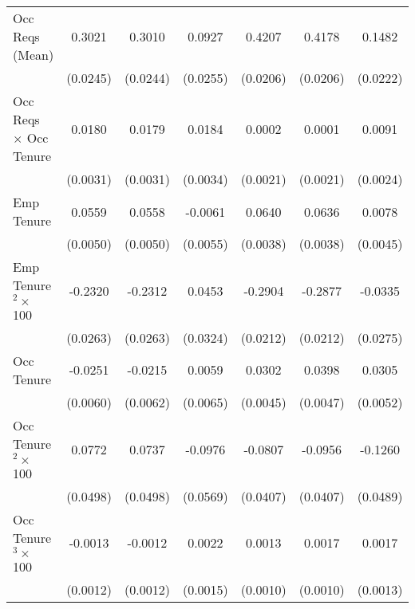{\begin{longtable}{l*{6}{c}}
Occ Reqs (Mean)     &      0.3021\sym{***}&      0.3010\sym{***}&      0.0927\sym{***}&      0.4207\sym{***}&      0.4178\sym{***}&      0.1482\sym{***}\\
                    &    (0.0245)         &    (0.0244)         &    (0.0255)         &    (0.0206)         &    (0.0206)         &    (0.0222)         \\
Occ Reqs $\times$ Occ Tenure&      0.0180\sym{***}&      0.0179\sym{***}&      0.0184\sym{***}&      0.0002         &      0.0001         &      0.0091\sym{***}\\
                    &    (0.0031)         &    (0.0031)         &    (0.0034)         &    (0.0021)         &    (0.0021)         &    (0.0024)         \\
Emp Tenure          &      0.0559\sym{***}&      0.0558\sym{***}&     -0.0061         &      0.0640\sym{***}&      0.0636\sym{***}&      0.0078\sym{*}  \\
                    &    (0.0050)         &    (0.0050)         &    (0.0055)         &    (0.0038)         &    (0.0038)         &    (0.0045)         \\
Emp Tenure$^2\times$ 100&     -0.2320\sym{***}&     -0.2312\sym{***}&      0.0453         &     -0.2904\sym{***}&     -0.2877\sym{***}&     -0.0335         \\
                    &    (0.0263)         &    (0.0263)         &    (0.0324)         &    (0.0212)         &    (0.0212)         &    (0.0275)         \\
Occ Tenure          &     -0.0251\sym{***}&     -0.0215\sym{***}&      0.0059         &      0.0302\sym{***}&      0.0398\sym{***}&      0.0305\sym{***}\\
                    &    (0.0060)         &    (0.0062)         &    (0.0065)         &    (0.0045)         &    (0.0047)         &    (0.0052)         \\
Occ Tenure$^2\times$ 100&      0.0772         &      0.0737         &     -0.0976\sym{*}  &     -0.0807\sym{**} &     -0.0956\sym{**} &     -0.1260\sym{***}\\
                    &    (0.0498)         &    (0.0498)         &    (0.0569)         &    (0.0407)         &    (0.0407)         &    (0.0489)         \\
Occ Tenure$^3\times$ 100&     -0.0013         &     -0.0012         &      0.0022         &      0.0013         &      0.0017\sym{*}  &      0.0017         \\
                    &    (0.0012)         &    (0.0012)         &    (0.0015)         &    (0.0010)         &    (0.0010)         &    (0.0013)         \\

\end{longtable}}
